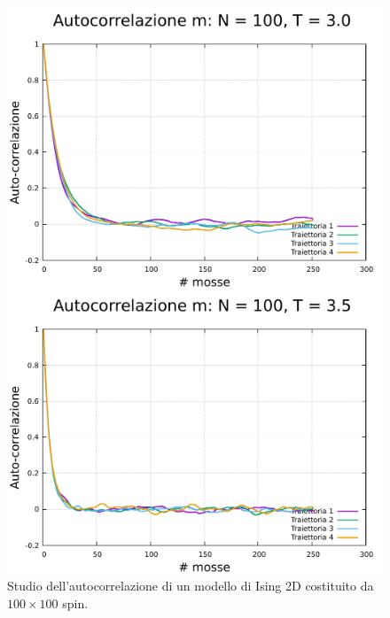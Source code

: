 \begin{figure}[htbp]
    \begin{minipage}{0.45\textwidth}  
      \centering
      \includegraphics[page=1, width=\textwidth]{Immagini/simIsing2D/metro/tcorr/auto_100_3.0.pdf}
      \caption{$T\,=\,3.0$}
    \end{minipage}\hfill
    \begin{minipage}{0.45\textwidth}  
      \centering
      \includegraphics[page=1, width=\textwidth]{Immagini/simIsing2D/metro/tcorr/auto_100_3.5.pdf}
      \caption{$T\,=\,3.5$}
    \end{minipage}
    \caption{Studio dell'autocorrelazione di un modello di Ising 2D costituito da $100 \times 100$ spin.}
\end{figure}


